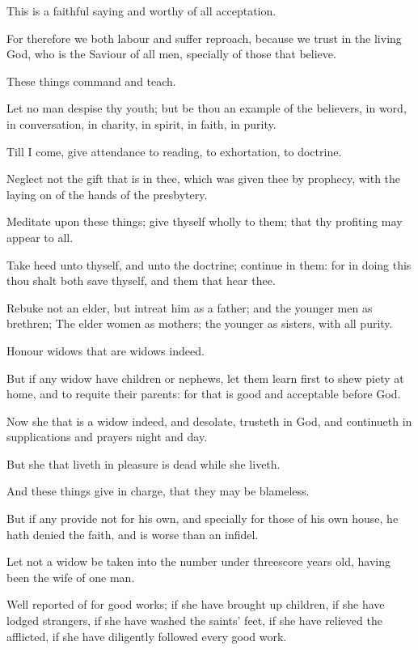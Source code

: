 \Verse This is a faithful saying and worthy of all acceptation.

\Verse For therefore we both labour and suffer reproach, because we trust in the living God, who is the Saviour of all men, specially of those that believe.

\Verse These things command and teach.

\Verse Let no man despise thy youth; but be thou an example of the believers, in word, in conversation, in charity, in spirit, in faith, in purity.

\Verse Till I come, give attendance to reading, to exhortation, to doctrine.

\Verse Neglect not the gift that is in thee, which was given thee by prophecy, with the laying on of the hands of the presbytery.

\Verse Meditate upon these things; give thyself wholly to them; that thy profiting may appear to all.

\Verse Take heed unto thyself, and unto the doctrine; continue in them: for in doing this thou shalt both save thyself, and them that hear thee.


\Chapter
\Verse Rebuke not an elder, but intreat him as a father; and the younger men as brethren; \Verse The elder women as mothers; the younger as sisters, with all purity.

\Verse Honour widows that are widows indeed.

\Verse But if any widow have children or nephews, let them learn first to shew piety at home, and to requite their parents: for that is good and acceptable before God.

\Verse Now she that is a widow indeed, and desolate, trusteth in God, and continueth in supplications and prayers night and day.

\Verse But she that liveth in pleasure is dead while she liveth.

\Verse And these things give in charge, that they may be blameless.

\Verse But if any provide not for his own, and specially for those of his own house, he hath denied the faith, and is worse than an infidel.

\Verse Let not a widow be taken into the number under threescore years old, having been the wife of one man.

\Verse Well reported of for good works; if she have brought up children, if she have lodged strangers, if she have washed the saints' feet, if she have relieved the afflicted, if she have diligently followed every good work.

